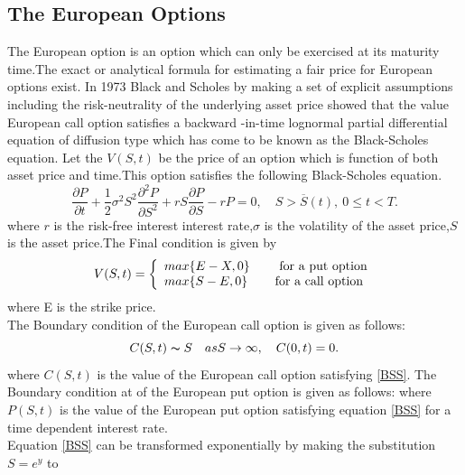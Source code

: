 \documentclass[12pt]{article}
\numberwithin{equation}{section} %
\begin{document}
\subsection{The European Options}
 The European option is an option
which can only be exercised at its maturity time.The exact or
analytical formula for estimating a fair price   for European
options exist. In 1973 Black and Scholes by making  a set of
explicit  assumptions including  the risk-neutrality of the
underlying asset price showed that the value European  call option
satisfies a backward -in-time lognormal partial differential
equation of diffusion type which has come to be known as the
Black-Scholes equation\cite{BS73}.
  Let the $V(S,t)$ be the price of an option which is function of both
  asset price and time.This option satisfies the following
  Black-Scholes equation.
  \begin{equation} \label{BSS}
\frac{\partial P}{\partial t}+\frac{1}{2}\sigma^2S^2\frac{\partial^2
P}{\partial S^2} +rS\frac{\partial P}{\partial S}-rP=0, \quad S
> \overline{S}(t),\ 0 \le t < T.
\end{equation}
where $r$ is the risk-free interest interest rate,$\sigma$ is the
volatility of the asset price,$S$ is the asset price.The Final
condition is given by\cite{Wilmot}
\[V(S,t) = \left\{
\begin{array}{l l}\label{FNC}
  max\{E-X,0\} & \quad \mbox{ for a put option}\\
  max\{S-E,0\}& \quad \mbox{for a call option}\\ \end{array} \right. \]
  where E is the strike price.\\
  The Boundary condition  of the European call option  is given as
  follows:
  \begin{equation}
C(S,t)\thicksim S  \quad
 as S\rightarrow\infty ,\quad C(0,t)=0.
\end{equation}
where $C(S,t)$ is the value of the European call option satisfying
\ref{BSS}. The Boundary condition  at of the European put option is
given as follows:
where $P(S,t)$ is the value of the European put  option
satisfying equation \ref{BSS} for a time dependent interest rate.\\
 Equation \ref{BSS} can be transformed exponentially by making the
substitution $S=e^y$ to
\end{document}
